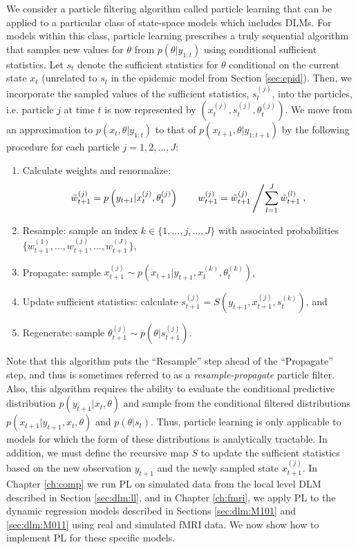 We consider a particle filtering algorithm called particle learning \citep{Carv:Joha:Lope:Pols:part} that can be applied to a particular class of state-space models which includes DLMs. For models within this class, particle learning prescribes a truly sequential algorithm that samples new values for $\theta$ from $p(\theta|y_{1:t})$ using conditional sufficient statistics. Let $s_t$ denote the sufficient statistics for $\theta$ conditional on the current state $x_t$ (unrelated to $s_t$ in the epidemic model from Section \ref{sec:epid}). Then, we incorporate the sampled values of the sufficient statistics, $s_t^{(j)}$, into the particles, i.e. particle $j$ at time $t$ is now represented by $\left(x_t^{(j)},s_t^{(j)},\theta_t^{(j)}\right)$. We move from an approximation to $p(x_t,\theta|y_{1:t})$ to that of $p(x_{t+1},\theta|y_{1:t+1})$ by the following procedure for each particle $j = 1,2,\ldots,J$:
\begin{enumerate}
\item Calculate weights and renormalize:
    \[\tilde{w}_{t+1}^{(j)} = p\left(y_{t+1}|x_t^{(j)},\theta_t^{(j)}\right) \qquad w_{t+1}^{(j)} = \tilde{w}_{t+1}^{(j)} \left/ \sum_{l=1}^J \tilde{w}_{t+1}^{(l)}\right.,\]
\item Resample: sample an index $k \in \{1,\ldots,j,\ldots,J\}$ with associated probabilities $\{w_{t+1}^{(1)},\ldots,w_{t+1}^{(j)},\ldots,w_{t+1}^{(J)}\}$,
\item Propagate: sample $x_{t+1}^{(j)} \sim p\left(x_{t+1}|y_{t+1},x_t^{(k)},\theta_t^{(k)}\right)$,
\item Update sufficient statistics: calculate $s_{t+1}^{(j)} = S\left(y_{t+1},x_{t+1}^{(j)},s_t^{(k)}\right)$, and
\item Regenerate: sample $\theta_{t+1}^{(j)} \sim p\left(\theta|s_{t+1}^{(j)}\right)$.
\end{enumerate}
Note that this algorithm puts the ``Resample'' step ahead of the ``Propagate'' step, and thus is sometimes referred to as a \emph{resample-propagate} particle filter. Also, this algorithm requires the ability to evaluate the conditional predictive distribution $p(y_{t+1}|x_t,\theta)$ and sample from the conditional filtered distributions $p(x_{t+1}|y_{t+1},x_t,\theta)$ and $p(\theta|s_t)$. Thus, particle learning is only applicable to models for which the form of these distributions is analytically tractable. In addition, we must define the recursive map $S$ to update the sufficient statistics based on the new observation $y_{t+1}$ and the newly sampled state $x_{t+1}^{(j)}$. In Chapter \ref{ch:comp} we run PL on simulated data from the local level DLM described in Section \ref{sec:dlm:ll}, and in Chapter \ref{ch:fmri}, we apply PL to the dynamic regression models described in Sections \ref{sec:dlm:M101} and \ref{sec:dlm:M011} using real and simulated fMRI data. We now show how to implement PL for these specific models.

